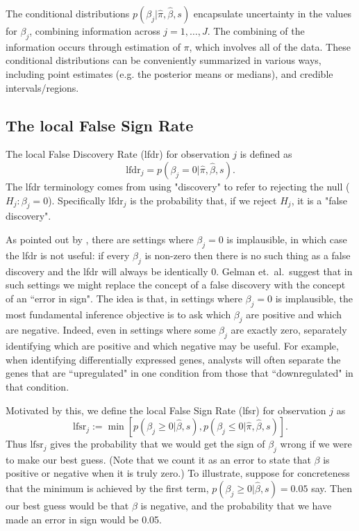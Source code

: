 \documentclass[11pt]{article}
\def\lfdr{\text{lfdr}}
\def\lfsr{\text{lfsr}}
\def\bhat{\hat{\beta}}
\begin{document}

The conditional distributions $p(\beta_j | \hat\pi, \bhat, s)$ 
encapsulate uncertainty in the values for $\beta_j$, combining information across
$j=1,\dots,J$. The combining of the information occurs through estimation of
$\pi$, which involves all of the data.
These conditional distributions can be conveniently summarized
in various ways, including point estimates (e.g. the posterior means or medians),
and credible intervals/regions.



\subsection*{The local False Sign Rate}

The local False Discovery Rate (lfdr) for observation $j$ is defined \cite{efron2001empirical} as
\begin{equation}
\lfdr_j = p(\beta_j = 0 | \hat\pi, \bhat, s).
\end{equation}
The lfdr terminology comes from using "discovery" to refer to rejecting the null ($H_j:\beta_j=0$).
Specifically $\lfdr_j$ is the probability that, if we reject $H_j$,
it is a  "false discovery".  


As pointed out by \cite{gelman2012we}, there are settings where
$\beta_j=0$ is implausible, in which case the lfdr is not useful: if every $\beta_j$ is non-zero then there
is no such thing as a false discovery and the lfdr will always be identically 0. 
Gelman et.~al.~suggest that in such settings we
might replace the concept of a false discovery with the
concept of an ``error in sign". The idea is that, in settings where $\beta_j=0$ is implausible, the most fundamental
inference objective is to ask which $\beta_j$ are positive and which are negative. Indeed, even in settings where some
$\beta_j$ are exactly zero, separately identifying which are positive and which negative may be useful. For example, when identifying differentially expressed genes,
analysts will often separate the genes that are ``upregulated" in one condition from those that ``downregulated" in that condition.

Motivated by this, we define the local False Sign Rate (lfsr) for observation $j$ as 
\begin{equation}
\lfsr_j := \min[ p(\beta_j \geq 0| \bhat, s), p(\beta_j \leq 0| \hat\pi, \bhat, s) ].
\end{equation}
Thus $\lfsr_j$ gives the probability that we would get the sign of $\beta_j$ wrong if we
were to make our best guess. (Note that we count it as an error to state that $\beta$ is positive or negative when it is truly zero.)
To illustrate, suppose for concreteness
that the minimum is achieved by the first term, $p(\beta_j \geq 0| \bhat, s)=0.05$ say. Then
our best guess would be that $\beta$ is negative, and the probability that we have
made an error in sign would be 0.05. 
\end{document}

